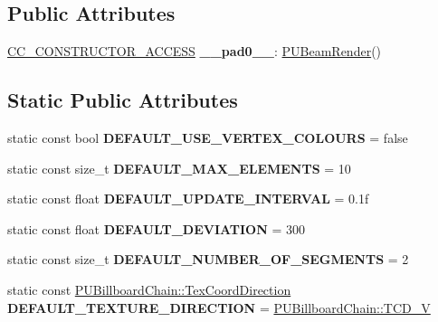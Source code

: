 \subsection*{Public Attributes}
\begin{DoxyCompactItemize}
\item 
\mbox{\label{classPUBeamRender_a62178deae655bad7160470e861d3e2d5}} 
\hyperlink{_2cocos2d_2cocos_2base_2ccConfig_8h_a25ef1314f97c35a2ed3d029b0ead6da0}{C\+C\+\_\+\+C\+O\+N\+S\+T\+R\+U\+C\+T\+O\+R\+\_\+\+A\+C\+C\+E\+SS} {\bfseries \+\_\+\+\_\+pad0\+\_\+\+\_\+}\+: \hyperlink{classPUBeamRender}{P\+U\+Beam\+Render}()
\end{DoxyCompactItemize}
\subsection*{Static Public Attributes}
\begin{DoxyCompactItemize}
\item 
\mbox{\label{classPUBeamRender_afb6be12250f2aa6237b8b1edd03dfa06}} 
static const bool {\bfseries D\+E\+F\+A\+U\+L\+T\+\_\+\+U\+S\+E\+\_\+\+V\+E\+R\+T\+E\+X\+\_\+\+C\+O\+L\+O\+U\+RS} = false
\item 
\mbox{\label{classPUBeamRender_a53f34647f3ef127821d1df26a57a857a}} 
static const size\+\_\+t {\bfseries D\+E\+F\+A\+U\+L\+T\+\_\+\+M\+A\+X\+\_\+\+E\+L\+E\+M\+E\+N\+TS} = 10
\item 
\mbox{\label{classPUBeamRender_a6ae77fda05f0e9fda40d96a01cec1d76}} 
static const float {\bfseries D\+E\+F\+A\+U\+L\+T\+\_\+\+U\+P\+D\+A\+T\+E\+\_\+\+I\+N\+T\+E\+R\+V\+AL} = 0.\+1f
\item 
\mbox{\label{classPUBeamRender_aa92841e18d1b4fa7435747521c157f32}} 
static const float {\bfseries D\+E\+F\+A\+U\+L\+T\+\_\+\+D\+E\+V\+I\+A\+T\+I\+ON} = 300
\item 
\mbox{\label{classPUBeamRender_a640a2af21b99192ffc2e3ec4bab6b958}} 
static const size\+\_\+t {\bfseries D\+E\+F\+A\+U\+L\+T\+\_\+\+N\+U\+M\+B\+E\+R\+\_\+\+O\+F\+\_\+\+S\+E\+G\+M\+E\+N\+TS} = 2
\item 
\mbox{\label{classPUBeamRender_a7571e978073b2cc3e1495ee9e34643dd}} 
static const \hyperlink{classPUBillboardChain_a6ebaec09a615199356b9d50fdab2209f}{P\+U\+Billboard\+Chain\+::\+Tex\+Coord\+Direction} {\bfseries D\+E\+F\+A\+U\+L\+T\+\_\+\+T\+E\+X\+T\+U\+R\+E\+\_\+\+D\+I\+R\+E\+C\+T\+I\+ON} = \hyperlink{classPUBillboardChain_a6ebaec09a615199356b9d50fdab2209fa04fbca157806680503db4c2f9c9cc125}{P\+U\+Billboard\+Chain\+::\+T\+C\+D\+\_\+V}
\end{DoxyCompactItemize}
